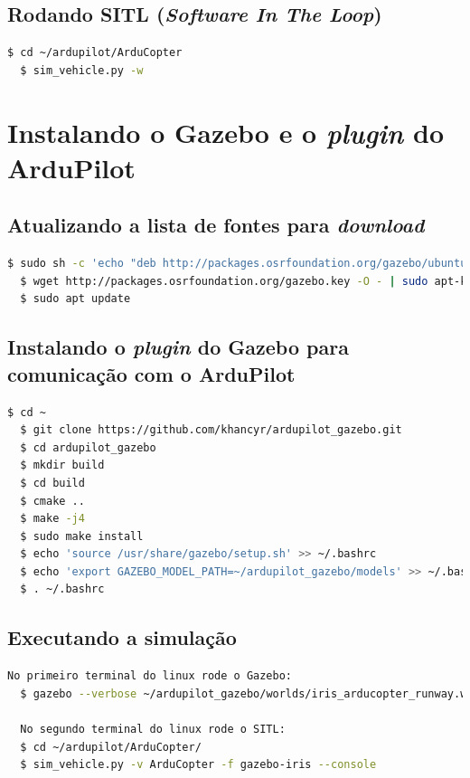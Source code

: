 \documentclass[12pt,a4paper,oneside]{book}
\begin{document}
\subsection{Rodando SITL (\textit{Software In The Loop})}
\begin{lstlisting}[language=bash]
  $ cd ~/ardupilot/ArduCopter
  $ sim_vehicle.py -w
\end{lstlisting}

\section{Instalando o Gazebo e o \textit{plugin} do ArduPilot}

\subsection{Atualizando a lista de fontes para \textit{download}}
\begin{lstlisting}[language=bash]
  $ sudo sh -c 'echo "deb http://packages.osrfoundation.org/gazebo/ubuntu-stable `lsb_release -cs` main" > /etc/apt/sources.list.d/gazebo-stable.list'
  $ wget http://packages.osrfoundation.org/gazebo.key -O - | sudo apt-key add -
  $ sudo apt update
\end{lstlisting}

\subsection{Instalando o \textit{plugin} do Gazebo para comunicação com o ArduPilot}
\begin{lstlisting}[language=bash]
  $ cd ~
  $ git clone https://github.com/khancyr/ardupilot_gazebo.git
  $ cd ardupilot_gazebo
  $ mkdir build
  $ cd build
  $ cmake ..
  $ make -j4
  $ sudo make install
  $ echo 'source /usr/share/gazebo/setup.sh' >> ~/.bashrc
  $ echo 'export GAZEBO_MODEL_PATH=~/ardupilot_gazebo/models' >> ~/.bashrc
  $ . ~/.bashrc
\end{lstlisting}

\subsection{Executando a simulação}
\begin{lstlisting}[language=bash]
  No primeiro terminal do linux rode o Gazebo: 
  $ gazebo --verbose ~/ardupilot_gazebo/worlds/iris_arducopter_runway.world
  
  No segundo terminal do linux rode o SITL:
  $ cd ~/ardupilot/ArduCopter/
  $ sim_vehicle.py -v ArduCopter -f gazebo-iris --console
\end{lstlisting}
\end{document}
